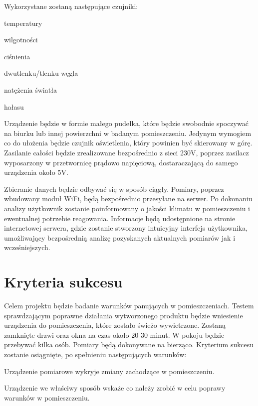 \documentclass[10pt, a4paper]{article}
\begin{document}
Wykorzystane zostaną następujące czujniki:

\begin{description}[font=$\bullet$~\normalfont]
\item temperatury
\item wilgotności
\item ciśnienia
\item dwutlenku/tlenku węgla
\item natężenia światła
\item hałasu
\end{description}

Urządzenie będzie w formie małego pudełka, które będzie swobodnie spoczywać na biurku lub innej powierzchni w badanym pomieszczeniu. Jedynym wymogiem co do ułożenia będzie czujnik oświetlenia, który powinien być skierowany w górę. Zasilanie całości będzie zrealizowane bezpośrednio z sieci 230V, poprzez zasilacz wyposarzony w przetwornicę prądowo napięciową, dostaraczającą do samego urządzenia około 5V.

Zbieranie danych będzie odbywać się w sposób ciągły. Pomiary, poprzez wbudowany moduł WiFi, będą bezpośrednio przesyłane na serwer. Po dokonaniu analizy użytkownik zostanie poinformowany o jakości klimatu w pomieszczeniu i ewentualnej potrzebie reagowania. Informacje będą udostępnione na stronie internetowej serwera, gdzie zostanie stworzony intuicyjny interfejs użytkownika, umożliwający bezpośrednią analizę pozyskanych aktualnych pomiarów jak i wcześniejszych.

\section{Kryteria sukcesu}
Celem projektu będzie badanie warunków panujących w pomieszczeniach. Testem sprawdzającym poprawne działania wytworzonego produktu będzie wniesienie urządzenia do pomieszczenia, które zostało świeżo wywietrzone. Zostaną zamknięte drzwi oraz okna na czas około 20-30 minut. W pokoju będzie przebywać kilka osób. Pomiary będą dokonywane na bierząco. Kryterium sukcesu zostanie osiągnięte, po spełnieniu następujących warunków:

\begin{description}[font=$\bullet$~\normalfont]
\item Urządzenie pomiarowe wykryje zmiany zachodzące w pomieszczeniu.
\item Urządzenie we właściwy sposób wskaże co należy zrobić w celu poprawy warunków w pomieszczeniu.
\end{description}
\end{document}

